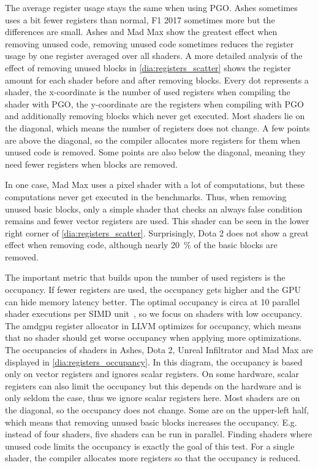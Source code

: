 The average register usage stays the same when using PGO. Ashes sometimes uses a bit fewer registers than normal, F1 2017 sometimes more but the differences are small.
Ashes and Mad Max show the greatest effect when removing unused code, removing unused code sometimes reduces the register usage by one register averaged over all shaders.
A more detailed analysis of the effect of removing unused blocks in \cref{dia:registers_scatter} shows the register amount for each shader before and after removing blocks.
Every dot represents a shader, the x-coordinate is the number of used registers when compiling the shader with PGO, the y-coordinate are the registers when compiling with PGO and additionally removing blocks which never get executed.
Most shaders lie on the diagonal, which means the number of registers does not change.
A few points are above the diagonal, so the compiler allocates more registers for them when unused code is removed.
Some points are also below the diagonal, meaning they need fewer registers when blocks are removed.


In one case, Mad Max uses a pixel shader with a lot of computations, but these computations never get executed in the benchmarks.
Thus, when removing unused basic blocks, only a simple shader that checks an always false condition remains and fewer vector registers are used.
This shader can be seen in the lower right corner of \cref{dia:registers_scatter}.
Surprisingly, Dota 2 does not show a great effect when removing code, although nearly \SI{20}{\percent} of the basic blocks are removed.

The important metric that builds upon the number of used registers is the occupancy.
If fewer registers are used, the occupancy gets higher and the GPU can hide memory latency better.
The optimal occupancy is circa at 10 parallel shader executions per SIMD unit~\cite{Aaltonen2017}, so we focus on shaders with low occupancy.
The amdgpu register allocator in LLVM optimizes for occupancy, which means that no shader should get worse occupancy when applying more optimizations.
The occupancies of shaders in Ashes, Dota 2, Unreal Infiltrator and Mad Max are displayed in \cref{dia:registers_occupancy}.
In this diagram, the occupancy is based only on vector registers and ignores scalar registers.
On some hardware, scalar registers can also limit the occupancy but this depends on the hardware and is only seldom the case, thus we ignore scalar registers here.
Most shaders are on the diagonal, so the occupancy does not change.
Some are on the upper-left half, which means that removing unused basic blocks increases the occupancy.
E.g. instead of four shaders, five shaders can be run in parallel.
Finding shaders where unused code limits the occupancy is exactly the goal of this test.
For a single shader, the compiler allocates more registers so that the occupancy is reduced.


